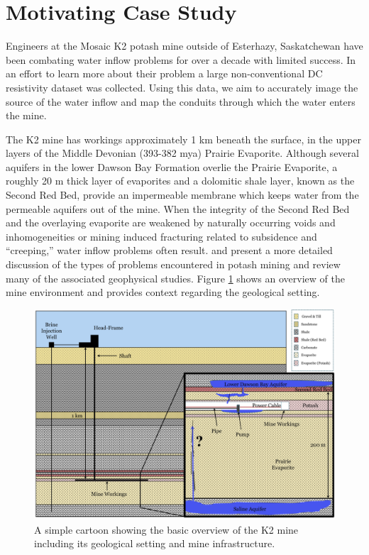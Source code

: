 \documentclass[final,authoryear,5p,times,twocolumn]{elsarticle}
\begin{document}
\section{Motivating Case Study}
\label{CaseStudy}

Engineers at the Mosaic K2 potash mine outside of Esterhazy, Saskatchewan have been combating water inflow problems for over a decade with limited success. In an effort to learn more about their problem a large non-conventional DC resistivity dataset was collected. Using this data, we aim to accurately image the source of the water inflow and map the conduits through which the water enters the mine.

The K2 mine has workings approximately 1 km beneath the surface, in the upper layers of the Middle Devonian (393-382 mya) Prairie Evaporite. Although several aquifers in the lower Dawson Bay Formation overlie the Prairie Evaporite, a roughly 20 m thick layer of evaporites and a dolomitic shale layer, known as the Second Red Bed, provide an impermeable membrane which keeps water from the permeable aquifers out of the mine. When the integrity of the Second Red Bed and the overlaying evaporite are weakened by naturally occurring voids and inhomogeneities or mining induced fracturing related to subsidence and ``creeping,'' water inflow problems often result. \cite{Gendzwill1992} and \cite{Chouteau1997} present a more detailed discussion of the types of problems encountered in potash mining and review many of the associated geophysical studies. Figure \ref{fig:Intro_ProblemCartoon} shows an overview of the mine environment and provides context regarding the geological setting.

\begin{figure} [!ht]
    \begin{center}
       \includegraphics{./Figures/Fig1.png}
    \end{center}
\caption{A simple cartoon showing the basic overview of the K2 mine including its geological setting and mine infrastructure.}
\label{fig:Intro_ProblemCartoon}
\end{figure}
\end{document}
